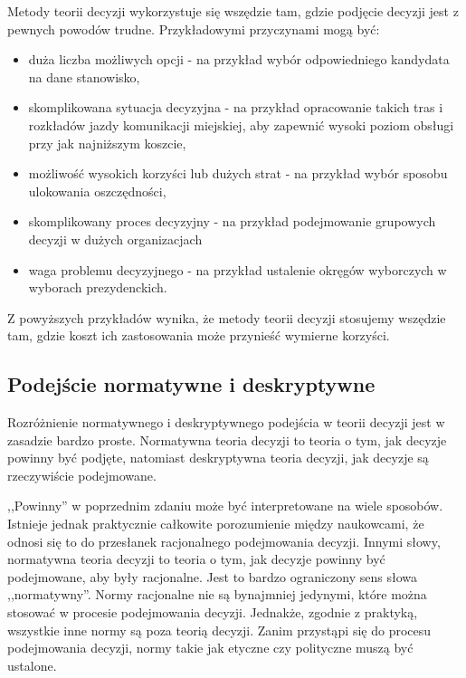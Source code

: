 Metody teorii decyzji wykorzystuje się wszędzie tam, gdzie podjęcie decyzji 
jest z pewnych powodów trudne. Przykładowymi przyczynami mogą być:
\begin{itemize}

  \item duża liczba możliwych opcji - na przykład wybór odpowiedniego kandydata 
  na dane stanowisko,
  
  \item skomplikowana sytuacja decyzyjna - na przykład opracowanie takich tras 
  i rozkładów jazdy komunikacji miejskiej, aby zapewnić wysoki poziom obsługi 
  przy jak najniższym koszcie,
  
  \item możliwość wysokich korzyści lub dużych strat - na przykład wybór 
  sposobu ulokowania oszczędności,
  
  \item skomplikowany proces decyzyjny - na przykład podejmowanie grupowych 
  decyzji w dużych organizacjach
  
  \item waga problemu decyzyjnego - na przykład ustalenie okręgów wyborczych w 
  wyborach prezydenckich.

\end{itemize}

Z powyższych przykładów wynika, że metody teorii decyzji stosujemy wszędzie tam, 
gdzie koszt ich zastosowania może przynieść wymierne korzyści.

\subsection{Podejście normatywne i deskryptywne}
Rozróżnienie normatywnego i deskryptywnego podejścia w teorii decyzji jest w 
zasadzie bardzo proste. Normatywna teoria decyzji to teoria o tym, jak decyzje 
powinny być podjęte, natomiast deskryptywna teoria decyzji, jak decyzje są 
rzeczywiście podejmowane.

,,Powinny'' w poprzednim zdaniu może być interpretowane na wiele sposobów.
Istnieje jednak praktycznie całkowite porozumienie między naukowcami, że odnosi 
się to do przesłanek racjonalnego podejmowania decyzji. Innymi słowy, 
normatywna teoria decyzji to teoria o tym, jak decyzje powinny być podejmowane, 
aby były racjonalne. Jest to bardzo ograniczony sens słowa ,,normatywny''. Normy
racjonalne nie są bynajmniej jedynymi, które można stosować w procesie 
podejmowania decyzji. Jednakże, zgodnie z praktyką, wszystkie inne normy są 
poza teorią decyzji. Zanim przystąpi się do procesu podejmowania decyzji, normy
takie jak etyczne czy polityczne muszą być ustalone.

